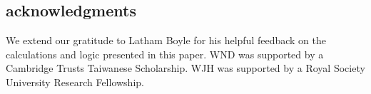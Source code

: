 \documentclass[%
 reprint,
 amsmath,amssymb,
 prl,
]{revtex4-2}
\begin{document}
\begin{acknowledgments}
\section{acknowledgments}
We extend our gratitude to Latham Boyle for his helpful feedback on the calculations and logic presented in this paper. WND was supported by a Cambridge Trusts Taiwanese Scholarship. WJH was supported by a Royal Society University Research Fellowship. 

\end{acknowledgments}
\vfill
\pagebreak






\let\oldbibitem\bibitem
\renewcommand{\bibitem}{%
    \renewcommand{\doi}[1]{doi: ##1}%
    \let\bibitem\oldbibitem%
    \oldbibitem%
}

\end{document}
